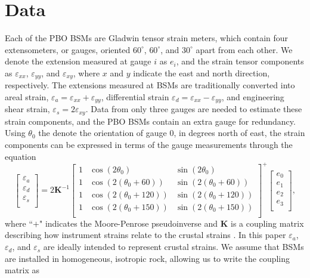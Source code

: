 \documentclass[10pt,a4paper]{article}
\begin{document}
\section{Data}
Each of the PBO BSMs are Gladwin tensor strain meters, which contain four extensometers, or gauges, oriented $60^\circ$, $60^\circ$, and $30^\circ$ apart from each other. We denote the extension measured at gauge $i$ as $e_i$, and the strain tensor components as $\varepsilon_{xx}$, $\varepsilon_{yy}$, and $\varepsilon_{xy}$, where $x$ and $y$ indicate the east and north direction, respectively. The extensions measured at BSMs are traditionally converted into areal strain, $\varepsilon_a = \varepsilon_{xx} + \varepsilon_{yy}$, differential strain $\varepsilon_d = \varepsilon_{xx} - \varepsilon_{yy}$, and engineering shear strain, $\varepsilon_s = 2\varepsilon_{xy}$. Data from only three gauges are needed to estimate these strain components, and the PBO BSMs contain an extra gauge for redundancy. Using $\theta_0$ the denote the orientation of gauge 0, in degrees north of east, the strain components can be expressed in terms of the gauge measurements through the equation 
\begin{equation}\label{eq:GaugeToStrain}
\left[\begin{array}{c}
\varepsilon_a \\
\varepsilon_d \\
\varepsilon_s \\
\end{array}\right]
=
2\mathbf{K}^{-1}\left[\begin{array}{ccc}
1 & \cos(2\theta_0) & \sin(2\theta_0) \\
1 & \cos(2(\theta_0 + 60)) & \sin(2(\theta_0 + 60)) \\
1 & \cos(2(\theta_0 + 120)) & \sin(2(\theta_0 + 120)) \\
1 & \cos(2(\theta_0 + 150)) & \sin(2(\theta_0 + 150)) \\
\end{array}\right]^+
\left[\begin{array}{c}
e_0 \\
e_1 \\
e_2 \\
e_3 \\
\end{array}\right],
\end{equation} 
where ``$+$" indicates the Moore-Penrose pseudoinverse and $\mathbf{K}$ is a coupling matrix describing how instrument strains relate to the crustal strains \citep{Hart1996}. In this paper $\varepsilon_a$, $\varepsilon_d$, and $\varepsilon_s$ are ideally intended to represent crustal strains. We assume that BSMs are installed in homogeneous, isotropic rock, allowing us to write the coupling matrix as
\end{document}
